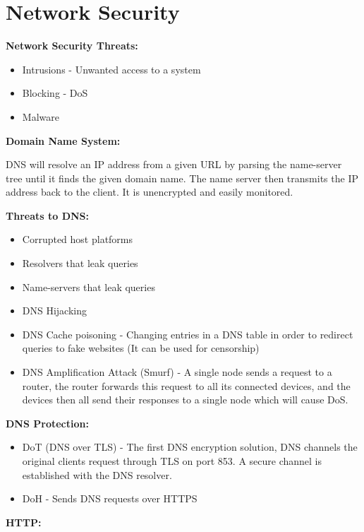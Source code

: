 \documentclass[]{article}
\date{}
\begin{document}
\hypertarget{network-security}{%
\section{Network Security}\label{network-security}}

\textbf{Network Security Threats:}

\begin{itemize}
\item
  Intrusions - Unwanted access to a system
\item
  Blocking - DoS
\item
  Malware
\end{itemize}

\textbf{Domain Name System:}

DNS will resolve an IP address from a given URL by parsing the
name-server tree until it finds the given domain name. The name server
then transmits the IP address back to the client. It is unencrypted and
easily monitored.

\textbf{Threats to DNS:}

\begin{itemize}
\item
  Corrupted host platforms
\item
  Resolvers that leak queries
\item
  Name-servers that leak queries
\item
  DNS Hijacking
\item
  DNS Cache poisoning - Changing entries in a DNS table in order to
  redirect queries to fake websites (It can be used for censorship)
\item
  DNS Amplification Attack (Smurf) - A single node sends a request to a
  router, the router forwards this request to all its connected devices,
  and the devices then all send their responses to a single node which
  will cause DoS.
\end{itemize}

\textbf{DNS Protection:}

\begin{itemize}
\item
  DoT (DNS over TLS) - The first DNS encryption solution, DNS channels
  the original clients request through TLS on port 853. A secure channel
  is established with the DNS resolver.
\item
  DoH - Sends DNS requests over HTTPS
\end{itemize}

\textbf{HTTP:}
\end{document}

